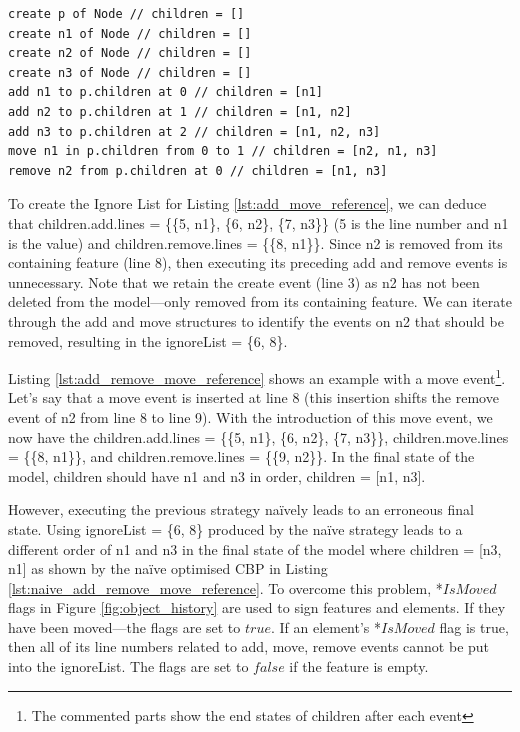 {\begin{lstlisting}[style=eol,caption={A CBP representation of add, move, and remove operations.},label=lst:add_remove_move_reference]
create p of Node // children = []
create n1 of Node // children = []
create n2 of Node // children = []
create n3 of Node // children = []
add n1 to p.children at 0 // children = [n1]
add n2 to p.children at 1 // children = [n1, n2]
add n3 to p.children at 2 // children = [n1, n2, n3]
move n1 in p.children from 0 to 1 // children = [n2, n1, n3]
remove n2 from p.children at 0 // children = [n1, n3]
\end{lstlisting}
  
  To create the Ignore List for Listing \ref{lst:add_move_reference}, we can deduce that \textsf{children}.\textsf{add}.\textsf{lines} = \{\{5, \textsf{n1}\}, \{6, \textsf{n2}\}, \{7, \textsf{n3}\}\} (5 is the line number and \textsf{n1} is the value) and \textsf{children}.\textsf{remove}.\textsf{lines} = \{\{8, \textsf{n1}\}\}. Since \textsf{n2} is removed from its containing feature (line 8), then executing its preceding add and remove events is unnecessary. Note that we retain the \textsf{create} event (line 3) as \textsf{n2} has not been deleted from the model—only removed from its containing feature. We can iterate through the add and move structures to identify the events on \textsf{n2} that should be removed, resulting in the \textsf{ignoreList} = \{6, 8\}.
  
  Listing \ref{lst:add_remove_move_reference} shows an example with a \textsf{move} event\footnote{The commented parts show the end states of \textsf{children} after each event}. Let’s say that a \textsf{move} event is inserted at line 8 (this insertion shifts the \textsf{remove} event of \textsf{n2} from line 8 to line 9). With the introduction of this \textsf{move} event, we now have the \textsf{children}.\textsf{add}.\textsf{lines} = \{\{5, \textsf{n1}\}, \{6, \textsf{n2}\}, \{7, \textsf{n3}\}\}, \textsf{children}.\textsf{move}.\textsf{lines} = \{\{8, \textsf{n1}\}\}, and \textsf{children}.\textsf{remove}.\textsf{lines} = \{\{9, \textsf{n2}\}\}. In the final state of the model, \textsf{children} should have \textsf{n1} and \textsf{n3} in order, \textsf{children} = [n1, n3].
  
  However, executing the previous strategy naïvely leads to an erroneous final state. Using \textsf{ignoreList} = \{6, 8\} produced by the naïve strategy leads to a different order of \textsf{n1} and \textsf{n3} in the final state of the model where \textsf{children} = [n3, n1] as shown by the naïve optimised CBP in Listing \ref{lst:naive_add_remove_move_reference}. To overcome this problem, *$IsMoved$ flags in Figure \ref{fig:object_history} are used to sign features and elements. If they have been moved—the flags are set to $true$. If an element’s *$IsMoved$ flag is true, then all of its line numbers related to \textsf{add}, \textsf{move}, \textsf{remove} events cannot be put into the \textsf{ignoreList}. The flags are set to $false$ if the feature is empty.
  
}
